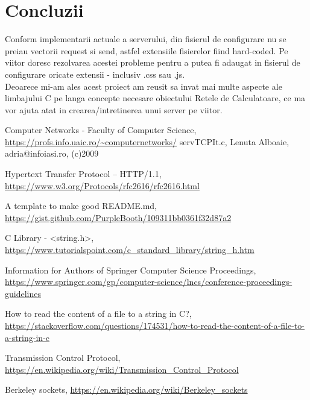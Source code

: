 \documentclass{llncs}
\begin{document}
\section{Concluzii}
Conform implementarii actuale a serverului, din fisierul de configurare
nu se preiau vectorii request si send, astfel extensiile fisierelor fiind hard-coded.
Pe viitor doresc rezolvarea acestei probleme pentru a putea fi adaugat in fisierul
de configurare oricate extensii - inclusiv .css sau .js.\\
Deoarece mi-am ales acest proiect am reusit sa invat mai multe aspecte ale limbajului
C pe langa  concepte necesare obiectului Retele de Calculatoare, ce ma vor ajuta
atat in crearea/intretinerea unui server pe viitor.






\begin{thebibliography}{8}

Computer Networks - Faculty of Computer Science, \url{https://profs.info.uaic.ro/~computernetworks/}
servTCPIt.c, Lenuta Alboaie, adria@infoiasi.ro, (c)2009

Hypertext Transfer Protocol -- HTTP/1.1, \url{https://www.w3.org/Protocols/rfc2616/rfc2616.html}

A template to make good README.md, \url{https://gist.github.com/PurpleBooth/109311bb0361f32d87a2}

C Library - <string.h>, \url{https://www.tutorialspoint.com/c_standard_library/string_h.htm}

Information for Authors of Springer Computer Science Proceedings, \url{https://www.springer.com/gp/computer-science/lncs/conference-proceedings-guidelines}


How to read the content of a file to a string in C?, \url{https://stackoverflow.com/questions/174531/how-to-read-the-content-of-a-file-to-a-string-in-c}

Transmission Control Protocol, \url{https://en.wikipedia.org/wiki/Transmission_Control_Protocol}

Berkeley sockets, \url{https://en.wikipedia.org/wiki/Berkeley_sockets}




\end{thebibliography}
\end{document}
